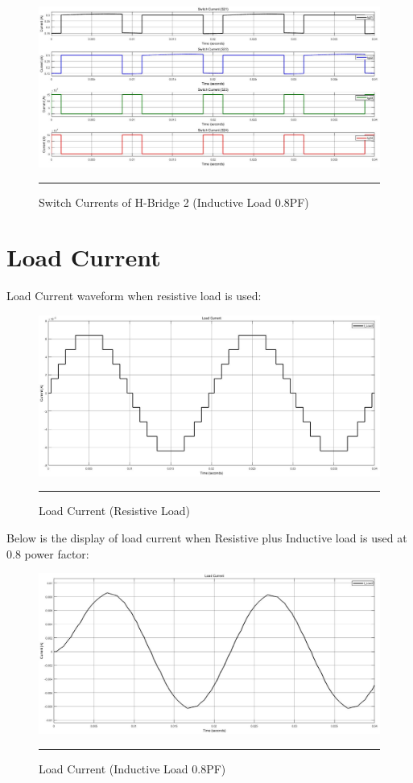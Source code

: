\begin{figure}[htbp]
	\centering
	\includegraphics[width = 6in]{./Figures/Photos/Simulink/Switch_currents_2_Induc.jpg}
	\rule{35em}{1pt}
	\caption{Switch Currents of H-Bridge 2 (Inductive Load 0.8PF)}
\end{figure}
\newpage
\section{Load Current}
Load Current waveform when resistive load is used:
\begin{figure}[htbp]
	\centering
	\includegraphics[width = 6in]{./Figures/Photos/Simulink/Load_Current_Res.jpg}
	\rule{35em}{1pt}
	\caption{Load Current (Resistive Load)}
\end{figure}
Below is the display of load current when Resistive plus Inductive load is used at 0.8 power factor:
\begin{figure}[htbp]
	\centering
	\includegraphics[width = 6in]{./Figures/Photos/Simulink/Load_Current_Induc.jpg}
	\rule{35em}{1pt}
	\caption{Load Current (Inductive Load 0.8PF)}
\end{figure}

